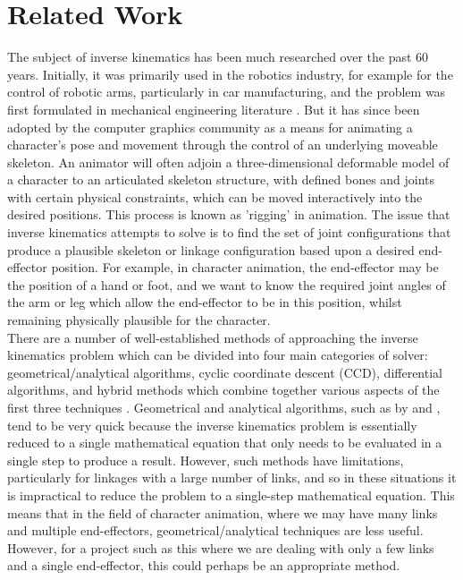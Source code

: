 \documentclass[paper=a4, fontsize=11pt]{scrartcl} %
\numberwithin{equation}{section} %
\numberwithin{figure}{section} %
\numberwithin{table}{section} %
\begin{document}

\section{Related Work}
The subject of inverse kinematics has been much researched over the past 60 years. Initially, it was primarily used in the robotics industry, for example for the control of robotic arms, particularly in car manufacturing, and the problem was first formulated in mechanical engineering literature \cite{Crai55}. But it has since been adopted by the computer graphics community as a means for animating a character's pose and movement through the control of an underlying moveable skeleton. An animator will often adjoin a three-dimensional deformable model of a character to an articulated skeleton structure, with defined bones and joints with certain physical constraints, which can be moved interactively into the desired positions. This process is known as 'rigging' in animation. The issue that inverse kinematics attempts to solve is to find the set of joint configurations that produce a plausible skeleton or linkage configuration based upon a desired end-effector position. For example, in character animation, the end-effector may be the position of a hand or foot, and we want to know the required joint angles of the arm or leg which allow the end-effector to be in this position, whilst remaining physically plausible for the character. \\

There are a number of well-established methods of approaching the inverse kinematics problem which can be divided into four main categories of solver: geometrical/analytical algorithms, cyclic coordinate descent (CCD), differential algorithms, and hybrid methods which combine together various aspects of the first three techniques \cite{Madd04}. Geometrical and analytical algorithms, such as by \cite{Chin96} and \cite{Kwan00}, tend to be very quick because the inverse kinematics problem is essentially reduced to a single mathematical equation that only needs to be evaluated in a single step to produce a result. However, such methods have limitations, particularly for linkages with a large number of links, and so in these situations it is impractical to reduce the problem to a single-step mathematical equation. This means that in the field of character animation, where we may have many links and multiple end-effectors, geometrical/analytical techniques are less useful. However, for a project such as this where we are dealing with only a few links and a single end-effector, this could perhaps be an appropriate method. \\
\end{document}
